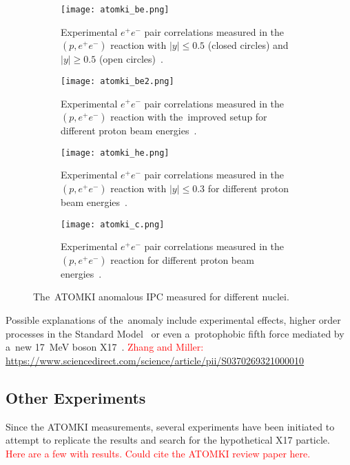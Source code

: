 				\begin{figure}
					\centering
					\begin{subfigure}[t]{0.48\textwidth}
						\centering
						\texttt{[image: atomki\_be.png]}
						\caption{Experimental $e^+e^-$ pair correlations measured in the~$(p,e^+e^-)$ reaction with $|y| \leq 0.5$ (closed circles) and $|y| \geq 0.5$ (open circles)~\cite{atomki_be}.}
						\label{fig:atomki_be}
					\end{subfigure}
					\hfill
					\begin{subfigure}[t]{0.42\textwidth}
						\centering
						\texttt{[image: atomki\_be2.png]}
						\caption{Experimental $e^+e^-$ pair correlations measured in the~$(p,e^+e^-)$ reaction with the~improved setup for different proton beam energies~\cite{atomki_be2}.}
						\label{fig:atomki_be2}
					\end{subfigure}
					\begin{subfigure}[t]{0.45\textwidth}
						\centering
						\texttt{[image: atomki\_he.png]}
						\caption{Experimental $e^+e^-$ pair correlations measured in the~$(p,e^+e^-)$ reaction with $|y| \leq 0.3$ for different proton beam energies~\cite{atomki_he2}.}
						\label{fig:atomki_he}
					\end{subfigure}
					\hfill
					\begin{subfigure}[t]{0.45\textwidth}
						\centering
						\texttt{[image: atomki\_c.png]}
						\caption{Experimental $e^+e^-$ pair correlations measured in the~$(p,e^+e^-)$ reaction for different proton beam energies~\cite{atomki_c}.}
						\label{fig:atomki_c}
					\end{subfigure}
					\caption{The~ATOMKI anomalous \ac{IPC} measured for different nuclei.}
					\label{fig:atomki}
				\end{figure}
			
				Possible explanations of the~anomaly include experimental effects, higher order processes in the Standard Model~\cite{kalman,aleksejevs} or even a~protophobic fifth force mediated by a~new 17~MeV boson X17~\cite{feng}. \textcolor{red}{Zhang and Miller: \url{https://www.sciencedirect.com/science/article/pii/S0370269321000010}}
		\subsection{Other Experiments}
			Since the ATOMKI measurements, several experiments have been initiated to attempt to replicate the results and search for the hypothetical X17 particle. \textcolor{red}{Here are a few with results. Could cite the ATOMKI review paper here.}
			
